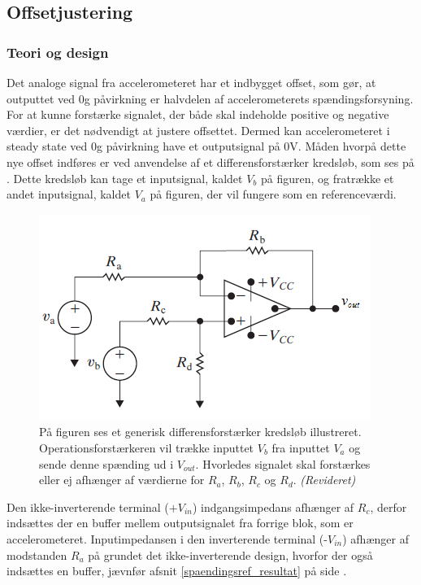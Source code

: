 \subsection{Offsetjustering}
\subsubsection{Teori og design} \label{Offset_Teori_Design}
Det analoge signal fra accelerometeret har et indbygget offset, som gør, at outputtet ved $0$g påvirkning er halvdelen af accelerometerets spændingsforsyning. For at kunne forstærke signalet, der både skal indeholde positive og negative værdier, er det nødvendigt at justere offsettet. Dermed kan accelerometeret i steady state ved $0$g påvirkning have et outputsignal på $0$V. Måden hvorpå dette nye offset indføres er ved anvendelse af et differensforstærker kredsløb, som ses på . Dette kredsløb kan tage et inputsignal, kaldet $V_{b}$ på figuren, og fratrække et andet inputsignal, kaldet $V_{a}$ på figuren, der vil fungere som en referenceværdi.
\begin{figure}[H]
\centering
\includegraphics[scale=1.3]{figures/cProblemloesning/Differensforstaerker_generisk1.png}
\caption{På figuren ses et generisk differensforstærker kredsløb illustreret. Operationsforstærkeren vil trække inputtet $V_{b}$ fra inputtet $V_{a}$ og sende denne spænding ud i $V_{out}$. Hvorledes signalet skal forstærkes eller ej afhænger af værdierne for $R_{a}$, $R_{b}$, $R_{c}$ og $R_{d}$. \textit{(Revideret)} \cite{Nilsson2011}}
\label{fig:Differensforstaerker_generisk}
\end{figure}
Den ikke-inverterende terminal ($+V_{in}$) indgangsimpedans afhænger af $R_{c}$, derfor indsættes der en buffer mellem outputsignalet fra forrige blok, som er accelerometeret. Inputimpedansen i den inverterende terminal (-$V_{in}$) afhænger af modstanden $R_{a}$ på  grundet det ikke-inverterende design, hvorfor der også indsættes en buffer, jævnfør afsnit \ref{spaendingsref_resultat} på side \pageref{spaendingsref_resultat}. \\
